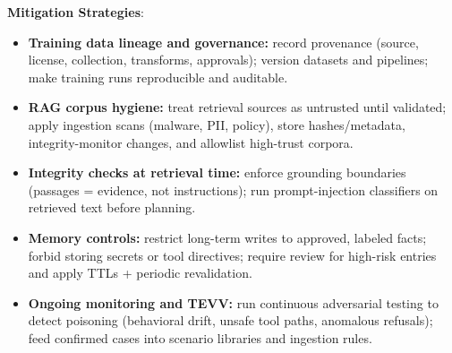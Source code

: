 \begin{TNtwocol}
    \textbf{Mitigation Strategies}:
    \begin{itemize}
        \item \textbf{Training data lineage and governance:} record provenance (source, license, collection, transforms, approvals); version datasets and pipelines; make training runs reproducible and auditable.
        \item \textbf{RAG corpus hygiene:} treat retrieval sources as untrusted until validated; apply ingestion scans (malware, PII, policy), store hashes/metadata, integrity-monitor changes, and allowlist high-trust corpora.
        \item \textbf{Integrity checks at retrieval time:} enforce grounding boundaries (passages = evidence, not instructions); run prompt-injection classifiers on retrieved text before planning.
        \item \textbf{Memory controls:} restrict long-term writes to approved, labeled facts; forbid storing secrets or tool directives; require review for high-risk entries and apply TTLs + periodic revalidation.
        \item \textbf{Ongoing monitoring and TEVV:} run continuous adversarial testing to detect poisoning (behavioral drift, unsafe tool paths, anomalous refusals); feed confirmed cases into scenario libraries and ingestion rules.
    \end{itemize}

\end{TNtwocol}
